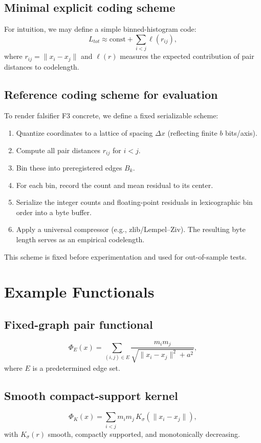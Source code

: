 \documentclass[11pt]{article}
\begin{document}
\subsection{Minimal explicit coding scheme}
For intuition, we may define a simple binned-histogram code:
\begin{equation}
  L_{tot} \approx \text{const} + \sum_{i<j} \ell(r_{ij}),
\end{equation}
where \(r_{ij} = \|x_i - x_j\|\) and \(\ell(r)\) measures the expected contribution of pair distances to codelength.

\subsection{Reference coding scheme for evaluation}
To render falsifier F3 concrete, we define a fixed serializable scheme:
\begin{enumerate}
  \item Quantize coordinates to a lattice of spacing \(\Delta x\) (reflecting finite \(b\) bits/axis).
  \item Compute all pair distances \(r_{ij}\) for \(i<j\).
  \item Bin these into preregistered edges \(B_k\).
  \item For each bin, record the count and mean residual to its center.
  \item Serialize the integer counts and floating-point residuals in lexicographic bin order into a byte buffer.
  \item Apply a universal compressor (e.g., zlib/Lempel–Ziv). The resulting byte length serves as an empirical codelength.
\end{enumerate}
This scheme is fixed before experimentation and used for out-of-sample tests.

\section{Example Functionals}
\subsection{Fixed-graph pair functional}
\begin{equation}
  \Phi_E(x) = \sum_{(i,j)\in E} \frac{m_i m_j}{\sqrt{\|x_i - x_j\|^2 + a^2}},
\end{equation}
where \(E\) is a predetermined edge set.

\subsection{Smooth compact-support kernel}
\begin{equation}
  \Phi_K(x) = \sum_{i<j} m_i m_j \, K_\sigma(\|x_i-x_j\|),
\end{equation}
with $K_\sigma(r)$ smooth, compactly supported, and monotonically decreasing.
\end{document}
